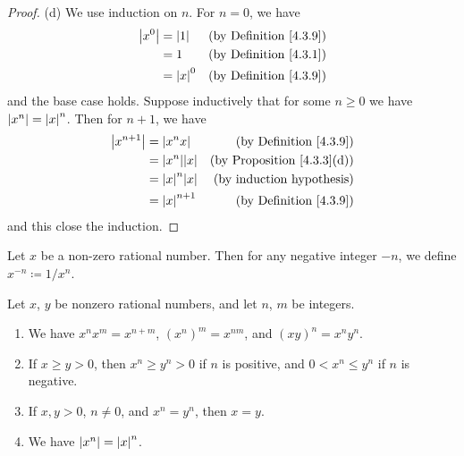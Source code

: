 \begin{proof}{(d)}
    We use induction on \(n\).
    For \(n = 0\), we have
    \begin{align*}
        \abs*{x^0} & = \abs*{1}   & \text{(by Definition \ref{4.3.9})} \\
                   & = 1          & \text{(by Definition \ref{4.3.1})} \\
                   & = \abs*{x}^0 & \text{(by Definition \ref{4.3.9})}
    \end{align*}
    and the base case holds.
    Suppose inductively that for some \(n \geq 0\) we have \(\abs*{x^n} = \abs*{x}^n\).
    Then for \(n + 1\), we have
    \begin{align*}
        \abs*{x^{n + 1}} & = \abs*{x^n x}        & \text{(by Definition \ref{4.3.9})}     \\
                         & = \abs*{x^n} \abs*{x} & \text{(by Proposition \ref{4.3.3}(d))} \\
                         & = \abs*{x}^n \abs*{x} & \text{(by induction hypothesis)}       \\
                         & = \abs*{x}^{n + 1}    & \text{(by Definition \ref{4.3.9})}
    \end{align*}
    and this close the induction.
\end{proof}

\begin{definition}\label{4.3.11}
    Let \(x\) be a non-zero rational number.
    Then for any negative integer \(-n\), we define \(x^{-n} \coloneqq 1 / x^n\).
\end{definition}

\begin{proposition}\label{4.3.12}
    Let \(x\), \(y\) be nonzero rational numbers, and let \(n\), \(m\) be integers.
    \begin{enumerate}
        \item We have \(x^n x^m = x^{n + m}\), \((x^n)^m = x^{nm}\), and \((xy)^n = x^n y^n\).
        \item If \(x \geq y > 0\), then \(x^n \geq y^n > 0\) if \(n\) is positive, and \(0 < x^n \leq y^n\) if \(n\) is negative.
        \item If \(x, y > 0\), \(n \neq 0\), and \(x^n = y^n\), then \(x = y\).
        \item We have \(\abs*{x^n} = \abs*{x}^n\).
    \end{enumerate}
\end{proposition}

